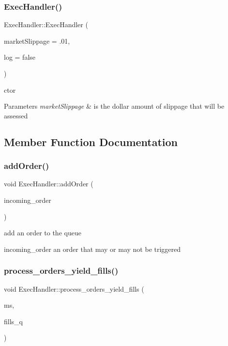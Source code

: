 \subsubsection{\texorpdfstring{Exec\+Handler()}{ExecHandler()}}
{\footnotesize\ttfamily Exec\+Handler\+::\+Exec\+Handler (\begin{DoxyParamCaption}\item[{const double \&}]{market\+Slippage = {\ttfamily .01},  }\item[{bool}]{log = {\ttfamily false} }\end{DoxyParamCaption})}



ctor 


\begin{DoxyParams}{Parameters}
{\em market\+Slippage} & is the dollar amount of slippage that will be assessed \\
\hline
\end{DoxyParams}


\subsection{Member Function Documentation}
\mbox{\label{classExecHandler_aee7a8bd39ed6fc1f9818c22103c0820a}} 
\subsubsection{\texorpdfstring{add\+Order()}{addOrder()}}
{\footnotesize\ttfamily void Exec\+Handler\+::add\+Order (\begin{DoxyParamCaption}\item[{const \hyperlink{classOrder}{Order} \&}]{incoming\+\_\+order }\end{DoxyParamCaption})}



add an order to the queue 

incoming\+\_\+order an order that may or may not be triggered \mbox{\label{classExecHandler_a041152ee704c3688b1097babbc830494}} 
\subsubsection{\texorpdfstring{process\+\_\+orders\+\_\+yield\+\_\+fills()}{process\_orders\_yield\_fills()}}
{\footnotesize\ttfamily void Exec\+Handler\+::process\+\_\+orders\+\_\+yield\+\_\+fills (\begin{DoxyParamCaption}\item[{\hyperlink{classMarketSnapshot}{Market\+Snapshot}}]{ms,  }\item[{std\+::queue$<$ \hyperlink{classFill}{Fill} $>$ \&}]{fills\+\_\+q }\end{DoxyParamCaption})}



